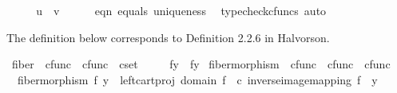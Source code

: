 \begin{isabellebody}
\ \ \isamarkupfalse%
\ \isamarkupfalse%
\ {\isachardoublequoteopen}u\ {\isacharequal}{\kern0pt}\ v{\isachardoublequoteclose}\isanewline
\ \ \ \ \isamarkupfalse%
\ eqn{}\ equals\ uniqueness\ \isamarkupfalse%
\ {\isacharparenleft}{\kern0pt}typecheck{\isacharunderscore}{\kern0pt}cfuncs{\isacharcomma}{\kern0pt}\ auto{\isacharparenright}{\kern0pt}\isanewline
{}\isamarkupfalse%
%
\endisatagproof
{\isafoldproof}%
%
\isadelimproof
%
\endisadelimproof
%
\isadelimdocument
%
\endisadelimdocument
%
\isatagdocument
%
\isamarkuptrue%
%
\endisatagdocument
{\isafolddocument}%
%
\isadelimdocument
%
\endisadelimdocument
%
\begin{isamarkuptext}%
The definition below corresponds to Definition 2.2.6 in Halvorson.%
\end{isamarkuptext}\isamarkuptrue%
\isamarkupfalse%
\ fiber\ {\isacharcolon}{\kern0pt}{\isacharcolon}{\kern0pt}\ {\isachardoublequoteopen}cfunc\ {\isasymRightarrow}\ cfunc\ {\isasymRightarrow}\ cset{\isachardoublequoteclose}\ {\isacharparenleft}{\kern0pt}{\isachardoublequoteopen}{\isacharunderscore}{\kern0pt}\isactrlsup {\isacharminus}{\kern0pt}\ {\isacharbrackleft}{\kern0pt}{}{}{}{\isacharcomma}{\kern0pt}{}{}{}{\isacharbrackright}{\kern0pt}{}{}{}{\isacharparenright}{\kern0pt}\ \isanewline
\ \ {\isachardoublequoteopen}f\isactrlsup {\isacharminus}{\kern0pt}y{\isacharbraceright}{\kern0pt}\ {\isacharequal}{\kern0pt}\ {\isacharparenleft}{\kern0pt}f\isactrlsup {\isacharminus}{\kern0pt}\isactrlbsub y\isactrlesub {\isacharparenright}{\kern0pt}{\isachardoublequoteclose}\isanewline
\isanewline
{}\isamarkupfalse%
\ fiber{\isacharunderscore}{\kern0pt}morphism\ {\isacharcolon}{\kern0pt}{\isacharcolon}{\kern0pt}\ {\isachardoublequoteopen}cfunc\ {\isasymRightarrow}\ cfunc\ {\isasymRightarrow}\ cfunc{\isachardoublequoteclose}\ \isanewline
\ \ {\isachardoublequoteopen}fiber{\isacharunderscore}{\kern0pt}morphism\ f\ y\ {\isacharequal}{\kern0pt}\ left{\isacharunderscore}{\kern0pt}cart{\isacharunderscore}{\kern0pt}proj\ {\isacharparenleft}{\kern0pt}domain\ f{\isacharparenright}{\kern0pt}\ {\isasymone}\ {\isasymcirc}\isactrlsub c\ inverse{\isacharunderscore}{\kern0pt}image{\isacharunderscore}{\kern0pt}mapping\ f\ {\isasymone}\ y{\isachardoublequoteclose}\isanewline

\end{isabellebody}
